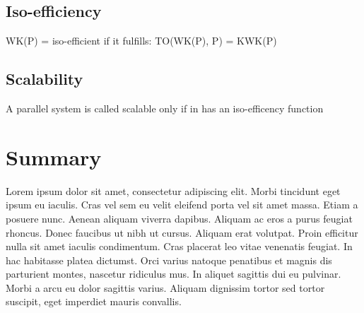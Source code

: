 \subsection{Iso-efficiency}
	WK(P) = iso-efficient if it fulfills:
	TO(WK(P), P) = KWK(P)~\cite[p.~350]{Lang17}
%
\subsection{Scalability}
	A parallel system is called scalable only if in has an iso-efficency function
%
%
%
%
%
\section{Summary}
Lorem ipsum dolor sit amet, consectetur adipiscing elit. Morbi tincidunt eget
ipsum eu iaculis. Cras vel sem eu velit eleifend porta vel sit amet massa. Etiam
a posuere nunc. Aenean aliquam viverra dapibus. Aliquam ac eros a purus feugiat
rhoncus. Donec faucibus ut nibh ut cursus. Aliquam erat volutpat. Proin efficitur
nulla sit amet iaculis condimentum. Cras placerat leo vitae venenatis feugiat. In
hac habitasse platea dictumst. Orci varius natoque penatibus et magnis dis
parturient montes, nascetur ridiculus mus. In aliquet sagittis dui eu pulvinar.
Morbi a arcu eu dolor sagittis varius. Aliquam dignissim tortor sed tortor
suscipit, eget imperdiet mauris convallis.
